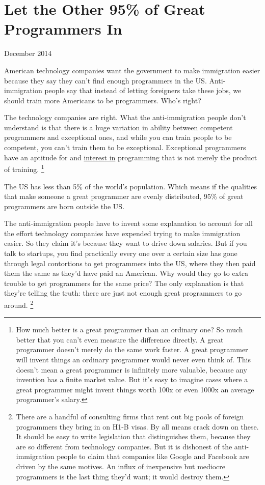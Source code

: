 \chapter{Let the Other 95\% of Great Programmers In}

December 2014

American technology companies want the government to make immigration
easier because they say they can't find enough programmers in the US.
Anti-immigration people say that instead of letting foreigners take
these jobs, we should train more Americans to be programmers. Who's
right?

The technology companies are right. What the anti-immigration people
don't understand is that there is a huge variation in ability between
competent programmers and exceptional ones, and while you can train
people to be competent, you can't train them to be exceptional.
Exceptional programmers have an aptitude for and
\href{genius.html}{interest in} programming that is not merely the
product of training. \footnote{How much better is a great programmer than an ordinary one? So
much better that you can't even measure the difference directly. A great
programmer doesn't merely do the same work faster. A great programmer
will invent things an ordinary programmer would never even think of.
This doesn't mean a great programmer is infinitely more valuable,
because any invention has a finite market value. But it's easy to
imagine cases where a great programmer might invent things worth 100x or
even 1000x an average programmer's salary.}

The US has less than 5\% of the world's population. Which means if the
qualities that make someone a great programmer are evenly distributed,
95\% of great programmers are born outside the US.

The anti-immigration people have to invent some explanation to account
for all the effort technology companies have expended trying to make
immigration easier. So they claim it's because they want to drive down
salaries. But if you talk to startups, you find practically every one
over a certain size has gone through legal contortions to get
programmers into the US, where they then paid them the same as they'd
have paid an American. Why would they go to extra trouble to get
programmers for the same price? The only explanation is that they're
telling the truth: there are just not enough great programmers to go
around. \footnote{There are a handful of consulting firms that rent out big pools
of foreign programmers they bring in on H1-B visas. By all means crack
down on these. It should be easy to write legislation that distinguishes
them, because they are so different from technology companies. But it is
dishonest of the anti-immigration people to claim that companies like
Google and Facebook are driven by the same motives. An influx of
inexpensive but mediocre programmers is the last thing they'd want; it
would destroy them.}

